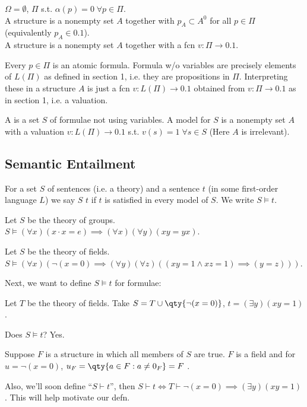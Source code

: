 \begin{example}
    $\Omega = \emptyset$, $\Pi$ s.t. $\alpha(p) = 0 \; \forall p \in \Pi$. \\
    A structure is a nonempty set $A$ together with $p_A \subset A^0$ for all $p \in \Pi$ (equivalently $p_A \in \qty{0, 1}$). \\
    A structure is a nonempty set $A$ together with a fcn $v : \Pi \to \qty{0, 1}$.

    Every $p \in \Pi$ is an atomic formula.
    Formula w/o variables are precisely elements of $L(\Pi)$ as defined in section 1, i.e. they are propositions in $\Pi$.
    Interpreting these in a structure $A$ is just a fcn $v : L(\Pi) \to \qty{0, 1}$ obtained from $v : \Pi \to \qty{0, 1}$ as in section 1, i.e. a valuation.

    A  is a set $S$ of formulae not using variables.
    A model for $S$ is a nonempty set $A$ with a valuation $v : L(\Pi) \to \qty{0, 1}$ s.t. $v(s) = 1 \; \forall s \in S$ (Here $A$ is irrelevant).
\end{example}

\subsection{Semantic Entailment}

\begin{definition}
    For a set $S$ of sentences (i.e. a theory) and a sentence $t$ (in some first-order language $L$) we say $S$  $t$ if $t$ is satisfied in every model of $S$.
    We write $S \models t$.
\end{definition}

\begin{example}[Groups]
    Let $S$ be the theory of groups.
    $S \models (\forall x)(x \cdot x = e) \implies (\forall x) (\forall y) (xy = yx)$.
\end{example}

\begin{example}[Fields]
    Let $S$ be the theory of fields.
    $S \models (\forall x) (\neg(x = 0) \implies (\forall y) (\forall z) ((xy = 1 \wedge xz = 1) \implies (y = z)))$.
\end{example}

Next, we want to define $S \models t$ for formulae:
\begin{example}
    Let $T$ be the theory of fields.
    Take $S = T \cup \qty{\neg(x = 0)}$, $t = (\exists y) (xy = 1)$.

    Does $S \models t$?
    Yes.

    Suppose $F$ is a structure in which all members of $S$ are true.
    $F$ is a field and for $u = \neg(x = 0)$, $u_F = \qty{a \in F : a \neq 0_F} = F$ \Lightning.

    Also, we'll soon define ``$S \vdash t$'', then $S \vdash t \iff T \vdash \neg(x = 0) \implies (\exists y)(xy = 1)$.
    This will help motivate our defn.
\end{example}

